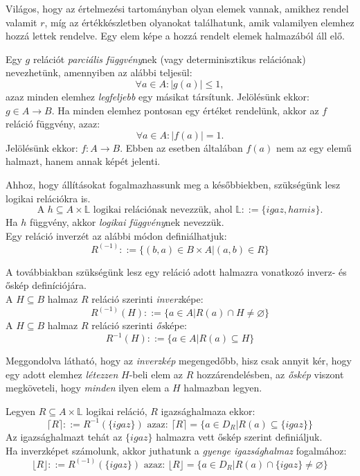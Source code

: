 \documentclass[12pt]{article}
\begin{document}
Világos, hogy az értelmezési tartományban olyan elemek vannak, amikhez rendel valamit $r$, míg az értékkészletben olyanokat találhatunk, amik valamilyen elemhez hozzá lettek rendelve. Egy elem képe a hozzá rendelt elemek halmazából áll elő.

Egy $g$ relációt \textit{parciális függvény}nek (vagy determinisztikus relációnak) nevezhetünk, amennyiben az alábbi teljesül:
$$\forall a \in A : |g(a)| \le 1,$$ azaz minden elemhez \textit{legfeljebb} egy másikat társítunk.
Jelölésünk ekkor: $g \in A \rightarrow B$.
Ha minden elemhez pontosan egy értéket rendelünk, akkor az $f$ reláció függvény, azaz:
$$\forall a \in A : |f(a)| = 1. $$
Jelölésünk ekkor: $ f: A \rightarrow B $. Ebben az esetben általában $f(a)$ nem az egy elemű halmazt, hanem annak képét jelenti.

Ahhoz, hogy állításokat fogalmazhassunk meg a későbbiekben, szükségünk lesz logikai relációkra is.
$$\text{A } h \subseteq A \times \mathbb{L} \text{ logikai relációnak nevezzük, ahol } \mathbb{L} ::= \{igaz, hamis\}.$$
Ha $h$ függvény, akkor \textit{logikai függvény}nek nevezzük.\\
Egy reláció inverzét az alábbi módon definiálhatjuk:
$$R^{(-1)} ::= \{(b,a) \in B \times A | (a,b) \in R  \}$$

A továbbiakban szükségünk lesz egy reláció adott halmazra vonatkozó inverz- és őskép definíciójára.\\
A $H \subseteq B $ halmaz $R$ reláció szerinti \textit{inverz}képe:
$$ R^{(-1)}(H) ::= \{ a \in A | R(a) \cap H \ne \varnothing \}$$
A $H \subseteq B $ halmaz $R$ reláció szerinti \textit{ős}képe:
$$ R^{-1}(H) ::= \{ a \in A | R(a) \subseteq H \}$$

Meggondolva látható, hogy az \textit{inverzkép} megengedőbb, hisz csak annyit kér, hogy egy adott elemhez \textit{létezzen} $H$-beli elem az $R$ hozzárendelésben, az \textit{őskép} viszont megköveteli, hogy \textit{minden} ilyen elem a $H$ halmazban legyen.

Legyen $R \subseteq A \times \mathbb{L}$ logikai reláció, $R$ igazsághalmaza ekkor:
$$  \lceil R \rceil ::= R^{-1}(\{igaz\}) \text{ azaz: } \lceil R \rceil = \{a \in D_R | R(a) \subseteq \{igaz\} \} $$
Az igazsághalmazt tehát az $\{igaz\}$ halmazra vett őskép szerint definiáljuk.\\
Ha inverzképet számolunk, akkor juthatunk a \textit{gyenge igazsághalmaz} fogalmához:
$$  \lfloor R \rfloor ::= R^{(-1)}(\{igaz\}) \text{ azaz: } \lfloor R \rfloor = \{a \in D_R | R(a) \cap \{igaz\} \ne \varnothing \} $$
\end{document}
